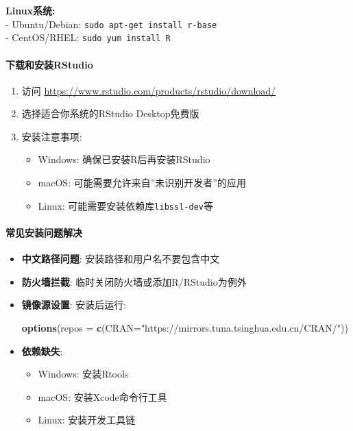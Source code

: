 \documentclass[
]{book}
\newenvironment{Shaded}{\begin{snugshade}}{\end{snugshade}}
\newcommand{\AttributeTok}[1]{\textcolor[rgb]{0.13,0.29,0.53}{#1}}
\newcommand{\FunctionTok}[1]{\textcolor[rgb]{0.13,0.29,0.53}{\textbf{#1}}}
\newcommand{\NormalTok}[1]{#1}
\newcommand{\StringTok}[1]{\textcolor[rgb]{0.31,0.60,0.02}{#1}}
\providecommand{\tightlist}{%
  \setlength{\itemsep}{0pt}\setlength{\parskip}{0pt}}
\begin{document}
\textbf{Linux系统:}\\
- Ubuntu/Debian: \texttt{sudo\ apt-get\ install\ r-base}\\
- CentOS/RHEL: \texttt{sudo\ yum\ install\ R}

\hypertarget{ux4e0bux8f7dux548cux5b89ux88c5rstudio}{%
\paragraph{下载和安装RStudio}\label{ux4e0bux8f7dux548cux5b89ux88c5rstudio}}

\begin{enumerate}
\def\labelenumi{\arabic{enumi}.}
\item
  访问 \url{https://www.rstudio.com/products/rstudio/download/}
\item
  选择适合你系统的RStudio Desktop免费版
\item
  安装注意事项:

  \begin{itemize}
  \tightlist
  \item
    Windows: 确保已安装R后再安装RStudio
  \item
    macOS: 可能需要允许来自''未识别开发者''的应用
  \item
    Linux: 可能需要安装依赖库\texttt{libssl-dev}等
  \end{itemize}
\end{enumerate}

\hypertarget{ux5e38ux89c1ux5b89ux88c5ux95eeux9898ux89e3ux51b3}{%
\paragraph{常见安装问题解决}\label{ux5e38ux89c1ux5b89ux88c5ux95eeux9898ux89e3ux51b3}}

\begin{itemize}
\item
  \textbf{中文路径问题}: 安装路径和用户名不要包含中文
\item
  \textbf{防火墙拦截}: 临时关闭防火墙或添加R/RStudio为例外
\item
  \textbf{镜像源设置}: 安装后运行:

\begin{Shaded}
\begin{Highlighting}[]
\FunctionTok{options}\NormalTok{(}\AttributeTok{repos =} \FunctionTok{c}\NormalTok{(}\AttributeTok{CRAN=}\StringTok{"https://mirrors.tuna.tsinghua.edu.cn/CRAN/"}\NormalTok{))}
\end{Highlighting}
\end{Shaded}
\item
  \textbf{依赖缺失}:

  \begin{itemize}
  \tightlist
  \item
    Windows: 安装Rtools
  \item
    macOS: 安装Xcode命令行工具
  \item
    Linux: 安装开发工具链
  \end{itemize}
\end{itemize}
\end{document}
